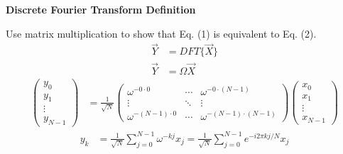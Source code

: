 \documentclass[a4paper, 10pt]{article}
\begin{document}
\subject
{}

\begin{problem}
\textbf{Discrete Fourier Transform Definition}
\par Use matrix multiplication to show that Eq. (1) is equivalent to Eq. (2).
\begin{align*}
	\vec{Y} & = DFT\{\vec{X}\} \\
	\vec{Y} & = \Omega\vec{X}
\end{align*}
\begin{align}
	\begin{pmatrix}
		y_0 \\ y_1 \\ \vdots \\ y_{N-1}
	\end{pmatrix} & = \frac{1}{\sqrt{N}} \begin{pmatrix}
		                                     \omega^{-0 \cdot 0}     & \cdots & \omega^{-0 \cdot (N-1)}     \\
		                                     \vdots                  & \ddots & \vdots                      \\
		                                     \omega^{-(N-1) \cdot 0} & \cdots & \omega^{-(N-1) \cdot (N-1)}
	                                     \end{pmatrix} \begin{pmatrix}
		                                                   x_0 \\ x_1 \\ \vdots \\ x_{N-1}
	                                                   \end{pmatrix}
\end{align}
\begin{align}
	y_k & = \frac{1}{\sqrt{N}} \sum_{j=0}^{N-1} \omega^{-kj} x_j = \frac{1}{\sqrt{N}} \sum_{j=0}^{N-1} e^{-i 2\pi kj/N} x_j
\end{align}
\end{problem}
\end{document}
